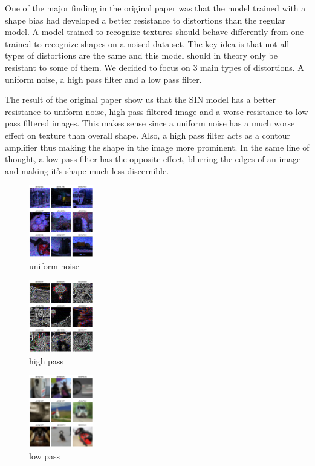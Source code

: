 \documentclass{article}
\begin{document}
One of the major finding in the original paper was that the model trained with a shape bias had developed a better resistance to distortions than the regular model.
A model trained to recognize textures should behave differently from one trained to recognize shapes on a noised data set.  The key idea is that not all types of distortions are the same and this model should in theory only be resistant to some of them.  We decided to focus on 3 main types of distortions.  A uniform noise, a high pass filter and a low pass filter.

The result of the original paper show us that the SIN model has a better resistance to uniform noise, high pass filtered image and a worse resistance to low pass filtered images.
This makes sense since a uniform noise has a much worse effect on texture than overall shape. Also, a high pass filter acts as a contour amplifier thus making the shape in the image more prominent. In the same line of thought, a low pass filter has the opposite effect, blurring the edges of an image and making it's shape much less discernible.

\begin{figure}[h!]
\centering
\includegraphics[width = 0.25\textwidth]{imgs/image_uniform}
\caption{uniform noise}
\end{figure}

\begin{figure}[h!]
\centering
\includegraphics[width = 0.25\textwidth]{imgs/image_high}
\caption{high pass}
\end{figure}

\begin{figure}[h!]
\centering
\includegraphics[width = 0.25\textwidth]{imgs/image_low}
\caption{low pass}

\end{figure}
\end{document}
